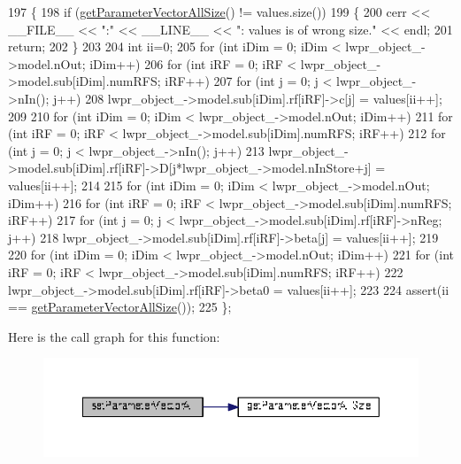 \begin{DoxyCode}
197                                                                       \{
198   \textcolor{keywordflow}{if} (\hyperlink{classDmpBbo_1_1ModelParametersLWPR_ab24d2485b3b795b516f4844f225100eb}{getParameterVectorAllSize}() != values.size())
199   \{
200     cerr << \_\_FILE\_\_ << \textcolor{stringliteral}{":"} << \_\_LINE\_\_ << \textcolor{stringliteral}{": values is of wrong size."} << endl;
201     \textcolor{keywordflow}{return};
202   \}
203   
204   \textcolor{keywordtype}{int} ii=0;
205   \textcolor{keywordflow}{for} (\textcolor{keywordtype}{int} iDim = 0; iDim < lwpr\_object\_->model.nOut; iDim++)
206     \textcolor{keywordflow}{for} (\textcolor{keywordtype}{int} iRF = 0; iRF < lwpr\_object\_->model.sub[iDim].numRFS; iRF++)
207       \textcolor{keywordflow}{for} (\textcolor{keywordtype}{int} j = 0; j < lwpr\_object\_->nIn(); j++)
208       lwpr\_object\_->model.sub[iDim].rf[iRF]->c[j] = values[ii++];
209 
210   for (\textcolor{keywordtype}{int} iDim = 0; iDim < lwpr\_object\_->model.nOut; iDim++)
211     \textcolor{keywordflow}{for} (\textcolor{keywordtype}{int} iRF = 0; iRF < lwpr\_object\_->model.sub[iDim].numRFS; iRF++)
212       \textcolor{keywordflow}{for} (\textcolor{keywordtype}{int} j = 0; j < lwpr\_object\_->nIn(); j++)
213       lwpr\_object\_->model.sub[iDim].rf[iRF]->D[j*lwpr\_object\_->model.nInStore+j] = values[ii++];
214 
215   for (\textcolor{keywordtype}{int} iDim = 0; iDim < lwpr\_object\_->model.nOut; iDim++)
216     \textcolor{keywordflow}{for} (\textcolor{keywordtype}{int} iRF = 0; iRF < lwpr\_object\_->model.sub[iDim].numRFS; iRF++)
217       \textcolor{keywordflow}{for} (\textcolor{keywordtype}{int} j = 0; j < lwpr\_object\_->model.sub[iDim].rf[iRF]->nReg; j++)
218         lwpr\_object\_->model.sub[iDim].rf[iRF]->beta[j] = values[ii++];
219 
220   for (\textcolor{keywordtype}{int} iDim = 0; iDim < lwpr\_object\_->model.nOut; iDim++)
221     \textcolor{keywordflow}{for} (\textcolor{keywordtype}{int} iRF = 0; iRF < lwpr\_object\_->model.sub[iDim].numRFS; iRF++)
222       lwpr\_object\_->model.sub[iDim].rf[iRF]->beta0 = values[ii++];
223 
224   assert(ii == \hyperlink{classDmpBbo_1_1ModelParametersLWPR_ab24d2485b3b795b516f4844f225100eb}{getParameterVectorAllSize}());   
225 \};
\end{DoxyCode}


Here is the call graph for this function\+:
\nopagebreak
\begin{figure}[H]
\begin{center}
\leavevmode
\includegraphics[width=350pt]{classDmpBbo_1_1ModelParametersLWPR_a9d3c8f22e8237a805af4935a647e5a50_cgraph}
\end{center}
\end{figure}




